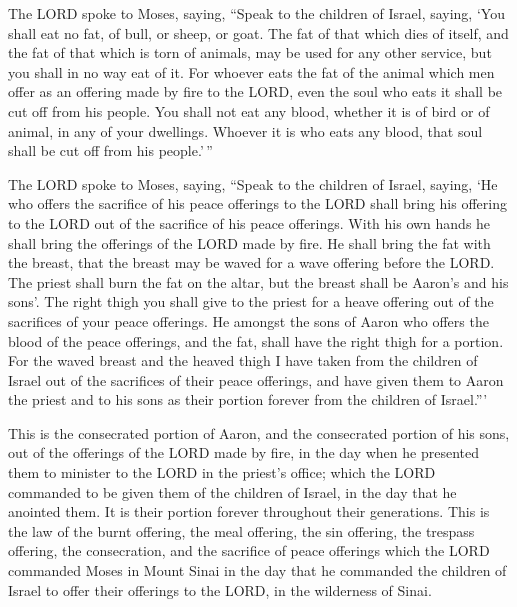  The LORD spoke to Moses, saying,  ``Speak
to the children of Israel, saying, `You shall eat no fat, of bull, or
sheep, or goat.  The fat of that which dies of itself,
and the fat of that which is torn of animals, may be used for any other
service, but you shall in no way eat of it.  For whoever
eats the fat of the animal which men offer as an offering made by fire
to the LORD, even the soul who eats it shall be cut off from his people.
 You shall not eat any blood, whether it is of bird or of
animal, in any of your dwellings.  Whoever it is who eats
any blood, that soul shall be cut off from his people.'\,''

 The LORD spoke to Moses, saying,  ``Speak
to the children of Israel, saying, `He who offers the sacrifice of his
peace offerings to the LORD shall bring his offering to the LORD out of
the sacrifice of his peace offerings.  With his own hands
he shall bring the offerings of the LORD made by fire. He shall bring
the fat with the breast, that the breast may be waved for a wave
offering before the LORD.  The priest shall burn the fat
on the altar, but the breast shall be Aaron's and his sons'.
 The right thigh you shall give to the priest for a heave
offering out of the sacrifices of your peace offerings. 
He amongst the sons of Aaron who offers the blood of the peace
offerings, and the fat, shall have the right thigh for a portion.
 For the waved breast and the heaved thigh I have taken
from the children of Israel out of the sacrifices of their peace
offerings, and have given them to Aaron the priest and to his sons as
their portion forever from the children of Israel.'''

 This is the consecrated portion of Aaron, and the
consecrated portion of his sons, out of the offerings of the LORD made
by fire, in the day when he presented them to minister to the LORD in
the priest's office;  which the LORD commanded to be
given them of the children of Israel, in the day that he anointed them.
It is their portion forever throughout their generations.
 This is the law of the burnt offering, the meal
offering, the sin offering, the trespass offering, the consecration, and
the sacrifice of peace offerings  which the LORD
commanded Moses in Mount Sinai in the day that he commanded the children
of Israel to offer their offerings to the LORD, in the wilderness of
Sinai.

